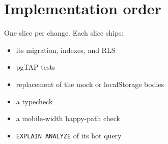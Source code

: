 \documentclass[11pt,a4paper]{article}
\newcommand{\code}[1]{\texttt{\small #1}}
\begin{document}
\section{Implementation order}
One slice per change. Each slice ships:
\begin{itemize}
  \item its migration, indexes, and RLS
  \item pgTAP tests
  \item replacement of the mock or localStorage bodies
  \item a typecheck
  \item a mobile-width happy-path check
  \item \code{EXPLAIN ANALYZE} of its hot query
\end{itemize}
\end{document}
